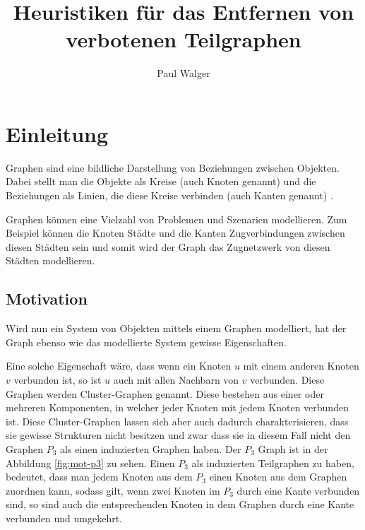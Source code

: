 \documentclass[12pt,a4paper,onecolumn,oneside,titlepage]{article}
\author{Paul Walger}
\title{Heuristiken für das Entfernen von verbotenen Teilgraphen}
\begin{document}
\maketitle
\tableofcontents
\newpage
\begin{abstract}
  
\end{abstract}
  
\section{Einleitung}

Graphen sind eine bildliche Darstellung von Beziehungen zwischen Objekten. Dabei stellt man die Objekte als Kreise (auch Knoten genannt) und die Beziehungen als Linien, die diese Kreise verbinden (auch Kanten genannt) \cite{Nastos06}.

Graphen können eine Vielzahl von Problemen und Szenarien modellieren. Zum Beispiel können die Knoten Städte und die Kanten Zugverbindungen zwischen diesen Städten sein und somit wird der Graph das Zugnetzwerk von diesen Städten modellieren. 

\subsection{Motivation}
\label{sec:mot}
Wird nun ein System von Objekten mittels einem Graphen modelliert, hat der Graph ebenso wie das modellierte System gewisse Eigenschaften.

Eine solche Eigenschaft wäre, dass wenn ein Knoten $u$ mit einem anderen Knoten $v$ verbunden ist, so ist $u$ auch mit allen Nachbarn von $v$ verbunden. Diese Graphen werden Cluster-Graphen  genannt. Diese bestehen aus einer oder mehreren Komponenten, in welcher jeder Knoten mit jedem Knoten verbunden ist.
Diese Cluster-Graphen lassen sich aber auch dadurch charakterisieren, dass sie gewisse Strukturen nicht besitzen und zwar dass sie in diesem Fall nicht den Graphen $P_3$ als einen induzierten Graphen haben. Der $P_3$ Graph ist in der Abbildung \ref{fig:mot-p3} zu sehen.
Einen $P_3$ als induzierten Teilgraphen zu haben, bedeutet, dass man jedem Knoten aus dem $P_3$ einen Knoten aus dem Graphen zuordnen kann, sodass gilt, wenn zwei Knoten im $P_3$ durch eine Kante verbunden sind, so sind auch die entsprechenden Knoten in dem Graphen durch eine Kante verbunden und umgekehrt.
 
\end{document}
